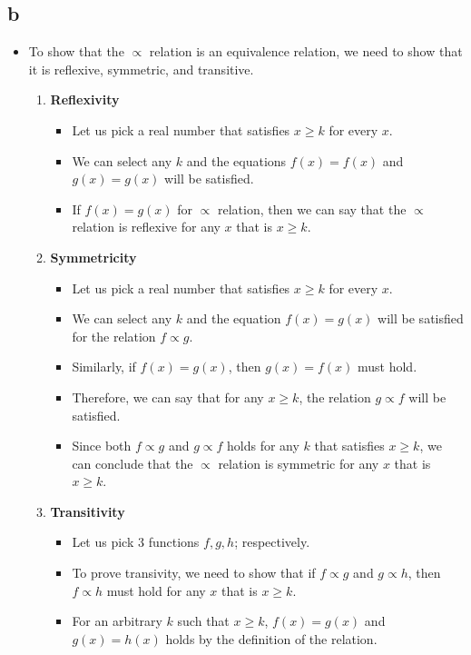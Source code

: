 \documentclass[12pt]{article}
\begin{document}
\subsection*{b}
\begin{itemize}
    \item To show that the $\propto$ relation is an equivalence relation, we need to show that it is reflexive, symmetric, and transitive. 
    \begin{enumerate}
        \item \textbf{Reflexivity}
        \begin{itemize}
            \item Let us pick a real number that satisfies $x \geq k$ for every $x$.
            \item We can select any $k$ and the equations $f(x)=f(x)$ and $g(x)=g(x)$ will be satisfied.
            \item If $f(x)=g(x)$ for $\propto$ relation, then we can say that the $\propto$ relation is reflexive for any $x$ that is $x \geq k$.
        \end{itemize}
        \item \textbf{Symmetricity}
        \begin{itemize}
            \item Let us pick a real number that satisfies $x \geq k$ for every $x$.
            \item We can select any $k$ and the equation $f(x)=g(x)$ will be satisfied for the relation $f \propto g$.
            \item Similarly, if $f(x)=g(x)$, then $g(x)=f(x)$ must hold.
            \item Therefore, we can say that for any $x \geq k$, the relation $g \propto f$ will be satisfied.
            \item Since both $f \propto g$ and $g \propto f$ holds for any $k$ that satisfies $x \geq k$, we can conclude that the $\propto$ relation is symmetric for any $x$ that is $x \geq k$.
        \end{itemize}
        \item \textbf{Transitivity}
        \begin{itemize}
            \item Let us pick 3 functions $f, g, h$; respectively.
            \item To prove transivity, we need to show that if $f \propto g$ and $g \propto h$, then $f \propto h$ must hold for any $x$ that is $x \geq k$.
            \item For an arbitrary $k$ such that $x \geq k$, $f(x)=g(x)$ and $g(x)=h(x)$ holds by the definition of the relation.

\end{itemize}
\end{enumerate}
\end{itemize}
\end{document}
